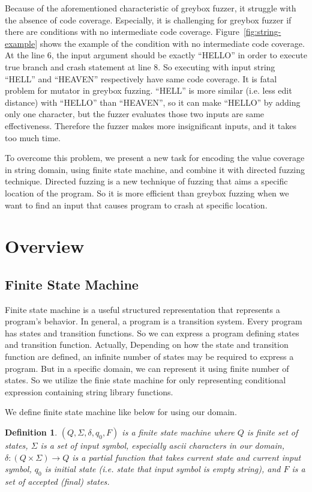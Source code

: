 \documentclass[12pt]{sigplanconf}
\newtheorem{definition}{Definition}[section]
\begin{document}
Because of the aforementioned characteristic of greybox fuzzer, it struggle with the absence of code coverage. Especially,
it is challenging for greybox fuzzer if there are conditions with no intermediate code coverage. Figure~\ref{fig:string-example}
shows the example of the condition with no intermediate code coverage. At the line 6, the input argument should be exactly
``HELLO'' in order to execute true branch and crash statement at line 8. So executing with input string ``HELL'' and
``HEAVEN'' respectively have same code coverage. It is fatal problem for mutator in greybox fuzzing. ``HELL'' is more
similar (i.e. less edit distance) with ``HELLO'' than ``HEAVEN'', so it can make ``HELLO'' by adding only one character,
but the fuzzer evaluates those two inputs are same effectiveness. Therefore the fuzzer makes more insignificant inputs,
and it takes too much time.

To overcome this problem, we present a new task for encoding the value coverage in string domain, using finite state machine,
and combine it with directed fuzzing technique. Directed fuzzing is a new technique of fuzzing that aims a specific location
of the program. So it is more efficient than greybox fuzzing when we want to find an input that causes program to crash
at specific location.

\section{Overview}
\subsection{Finite State Machine}
Finite state machine is a useful structured representation that represents a program's behavior. In general, a program is
a transition system. Every program has states and transition functions. So we can express a program defining states and
transition function. Actually, Depending on how the state and transition function are defined, an infinite number of states
may be required to express a program. But in a specific domain, we can represent it using finite number of states. So we
utilize the finie state machine for only representing conditional expression containing string library functions.

We define finite state machine like below for using our domain.

\begin{definition}
    $(Q, \Sigma, \delta, q_0, F)$ is a finite state machine where $Q$ is finite set of states, $\Sigma$ is a set of input
    symbol, especially ascii characters in our domain, $\delta : (Q \times \Sigma) \rightarrow Q$ is a partial function
    that takes current state and current input symbol, $q_0$ is initial state (i.e. state that input symbol is empty string),
    and $F$ is a set of accepted (final) states.
\end{definition}
\end{document}
